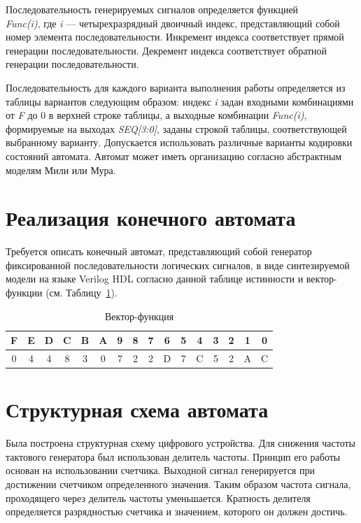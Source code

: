 Последовательность генерируемых сигналов определяется функцией~\\\textit{Func(i)}, где \textit{i} --- четырехразрядный двоичный индекс, представляющий собой номер элемента
последовательности. 
Инкремент индекса соответствует прямой генерации последовательности.
Декремент индекса соответствует обратной генерации последовательности.

Последовательность для каждого варианта выполнения работы определяется из
таблицы вариантов следующим образом: индекс \textit{i} задан входными комбинациями от \textit{F} до
0 в верхней строке таблицы, а выходные комбинации \textit{Func(i)}, формируемые на выходах
\textit{SEQ[3:0]}, заданы строкой таблицы, соответствующей выбранному варианту.
Допускается использовать различные варианты кодировки состояний автомата.
Автомат может иметь организацию согласно абстрактным моделям Мили или Мура.

\section {Реализация конечного автомата}
Требуется описать конечный автомат, представляющий собой генератор
фиксированной последовательности логических сигналов, в виде синтезируемой модели
на языке Verilog HDL согласно данной таблице истинности и вектор-функции (см. Таблицу~\ref{tab:func-vector}).

\begin{table}[h!]
	\centering
	\caption{Вектор-функция}
		\begin{tabular}{|c|c|c|c|c|c|c|c|c|c|c|c|c|c|c|c|}
			\hline
			F & E & D & C & B & A & 9 & 8 & 7 & 6 & 5 & 4 & 3 & 2 & 1 & 0 \\ \hline\hline
			0 & 4 & 4 & 8 & 3 & 0 & 7 & 2 & 2 & D & 7 & C & 5 & 2 & A & C \\ \hline
		\end{tabular}
		\label{tab:func-vector}
\end{table}

\section{Структурная схема автомата}
Была построена структурная схему цифрового устройства. Для снижения частоты тактового генератора был использован делитель частоты. Принцип его работы основан на использовании счетчика. Выходной сигнал генерируется при достижении счетчиком определенного значения. Таким образом частота сигнала, проходящего через делитель частоты уменьшается. Кратность делителя определяется разрядностью счетчика и значением, которого он должен достичь. 

